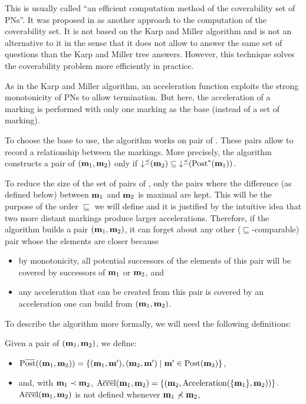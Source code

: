 This is usually called ``an efficient computation method of the coverability set of \acp{PN}''.
It was proposed in \cite{Geeraerts07thesis, Geeraerts07} as another approach to the computation of the coverability set.
It is not based on the Karp and Miller algorithm and is not an alternative to it in the sense that it does not allow to answer the same set of questions than the Karp and Miller tree answers.
However, this technique solves the coverability problem more efficiently in practice.

As in the Karp and Miller algorithm, an acceleration function exploits the strong monotonicity of \acp{PN} to allow termination.
But here, the acceleration of a marking is performed with only one marking as the base (instead of a set of marking).

To choose the base to use, the algorithm works on pair of \omarks.
These pairs allow to record a relationship between the markings.
More precisely, the algorithm constructs a pair of \omarks $(\mathbf{m}_1, \mathbf{m}_2)$ only if $\operatorname{\downarrow^\preceq}(\mathbf{m}_2) \subseteq \operatorname{\downarrow^\preceq}(\operatorname{Post}^*(\mathbf{m}_1))$.

To reduce the size of the set of pairs of \omarks, only the pairs where the difference (as defined below) between $\mathbf{m}_1$ and $\mathbf{m}_2$ is maximal are kept.
This will be the purpose of the order $\sqsubseteq$ we will define and it is justified by the intuitive idea that two more distant markings produce larger accelerations.
Therefore, if the algorithm builds a pair $(\mathbf{m}_1, \mathbf{m}_2)$, it can forget about any other ($\sqsubseteq$-comparable) pair whose the elements are closer because
\begin{itemize}
  \item by monotonicity, all potential successors of the elements of this pair will be covered by successors of $\mathbf{m}_1$ or $\mathbf{m}_2$, and
  \item any acceleration that can be created from this pair is covered by an acceleration one can build from $(\mathbf{m}_1, \mathbf{m}_2)$.
\end{itemize}

To describe the algorithm more formally, we will need the following definitions:

Given a pair of \omarks $(\mathbf{m}_1, \mathbf{m}_2)$, we define:
\begin{itemize}
  \item $\Postb((\mar_1, \mar_2)) = \{(\mar_1, \marp), (\mar_2, \marp) \mid \marp \in \Post(\mar_2)\}$,
  \item and, with $\mathbf{m}_1 \prec \mathbf{m}_2$, $\operatorname{A\overline{cce}l}(\mathbf{m}_1, \mathbf{m}_2) = \{(\mathbf{m}_2, \operatorname{Acceleration}(\{\mathbf{m}_1\}, \mathbf{m}_2))\}$.
    $\operatorname{A\overline{cce}l}(\mathbf{m}_1, \mathbf{m}_2)$ is not defined whenever $\mathbf{m}_1 \nprec \mathbf{m}_2$,
\end{itemize}

